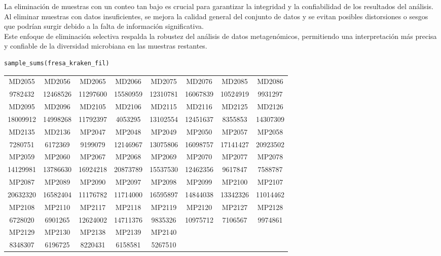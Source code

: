 La eliminación de muestras con un conteo tan bajo es crucial para garantizar la integridad y la confiabilidad de los resultados del análisis. Al eliminar muestras con datos insuficientes, se mejora la calidad general del conjunto de datos y se evitan posibles distorsiones o sesgos que podrían surgir debido a la falta de información significativa.\\

Este enfoque de eliminación selectiva respalda la robustez del análisis de datos metagenómicos, permitiendo una interpretación más precisa y confiable de la diversidad microbiana en las muestras restantes.\\

\begin{lstlisting}[basicstyle=\small] 
sample_sums(fresa_kraken_fil)
\end{lstlisting}

\resizebox{0.9\textwidth}{!} {
\begin{tabular}{ c c c c c c c c }
MD2055 & MD2056 & MD2065 & MD2066 & MD2075 & MD2076 & MD2085 & MD2086 \\
9782432 & 12468526 & 11297600 & 15580959 & 12310781 & 16067839 & 10524919 & 9931297 \\
MD2095 & MD2096 & MD2105 & MD2106 & MD2115 & MD2116 & MD2125 & MD2126 \\
18009912 & 14998268 & 11792397 & 4053295 & 13102554 & 12451637 & 8355853 & 14307309 \\
MD2135 & MD2136 & MP2047 & MP2048 & MP2049 & MP2050 & MP2057 & MP2058 \\
7280751 & 6172369 & 9199079 & 12146967 & 13075806 & 16098757 & 17141427 & 20923502 \\
MP2059 & MP2060 & MP2067 & MP2068 & MP2069 & MP2070 & MP2077 & MP2078 \\
14129981 & 13786630 & 16924218 & 20873789 & 15537530 & 12462356 & 9617847 & 7588787 \\
MP2087 & MP2089 & MP2090 & MP2097 & MP2098 & MP2099 & MP2100 & MP2107 \\
20632320 & 16582404 & 11176782 & 11714000 & 16595897 & 14844038 & 13342326 & 11014462 \\
MP2108 & MP2110 & MP2117 & MP2118 & MP2119 & MP2120 & MP2127 & MP2128 \\
6728020 & 6901265 & 12624002 & 14711376 & 9835326 & 10975712 & 7106567 & 9974861 \\
MP2129 & MP2130 & MP2138 & MP2139 & MP2140 \\
8348307 & 6196725 & 8220431 & 6158581 & 5267510
\end{tabular}
}

